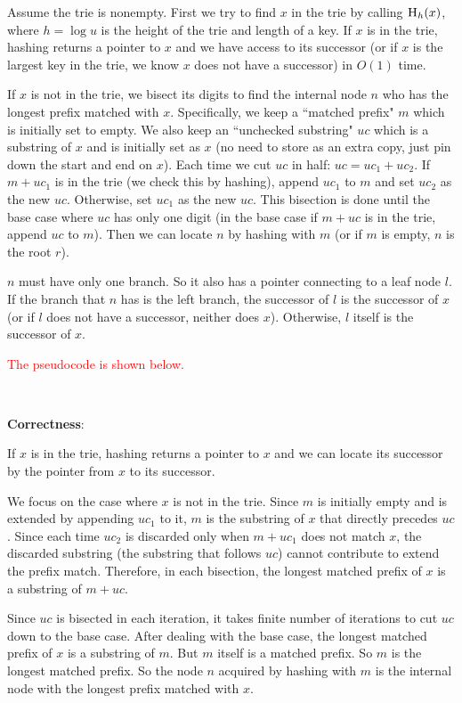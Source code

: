 \documentclass{article}
\begin{document}
Assume the trie is nonempty. First we try to find $x$ in the trie by calling $\textsc{H}_h(x)$, where $h=\log u$ is the height of the trie and length of a key. If $x$ is in the trie, hashing returns a pointer to $x$ and we have access to its successor (or if $x$ is the largest key in the trie, we know $x$ does not have a successor) in $O(1)$ time.

If $x$ is not in the trie, we bisect its digits to find the internal node $n$ who has the longest prefix matched with $x$. Specifically, we keep a ``matched prefix" $m$ which is initially set to empty. We also keep an ``unchecked substring" $uc$ which is a substring of $x$ and is initially set as $x$ (no need to store as an extra copy, just pin down the start and end on $x$). Each time we cut $uc$ in half: $uc=uc_1+uc_2$. If $m+uc_1$ is in the trie (we check this by hashing), append $uc_1$ to $m$ and set $uc_2$ as the new $uc$. Otherwise, set $uc_1$ as the new $uc$. This bisection is done until the base case where $uc$ has only one digit (in the base case if $m+uc$ is in the trie, append $uc$ to $m$). Then we can locate $n$ by hashing with $m$ (or if $m$ is empty, $n$ is the root $r$).

$n$ must have only one branch. So it also has a pointer connecting to a leaf node $l$. If the branch that $n$ has is the left branch, the successor of $l$ is the successor of $x$ (or if $l$ does not have a successor, neither does $x$). Otherwise, $l$ itself is the successor of $x$.

\textcolor{red}{The pseudocode is shown below.}

~

\noindent\textbf{Correctness}:

If $x$ is in the trie, hashing returns a pointer to $x$ and we can locate its successor by the pointer from $x$ to its successor.

We focus on the case where $x$ is not in the trie. Since $m$ is initially empty and is extended by appending $uc_1$ to it, $m$ is the substring of $x$ that directly precedes $uc$. Since each time $uc_2$ is discarded only when $m+uc_1$ does not match $x$, the discarded substring (the substring that follows $uc$) cannot contribute to extend the prefix match. Therefore, in each bisection, the longest matched prefix of $x$ is a substring of $m+uc$.

Since $uc$ is bisected in each iteration, it takes finite number of iterations to cut $uc$ down to the base case. After dealing with the base case, the longest matched prefix of $x$ is a substring of $m$. But $m$ itself is a matched prefix. So $m$ is the longest matched prefix. So the node $n$ acquired by hashing with $m$ is the internal node with the longest prefix matched with $x$.
\end{document}
